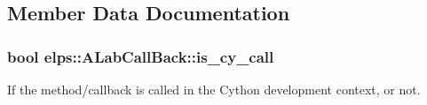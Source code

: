 \subsection{Member Data Documentation}
\hypertarget{classelps_1_1_a_lab_call_back_a15debd77d822894cfcd63465b0c35c21}{
\subsubsection[{is\+\_\+cy\+\_\+call}]{\setlength{\rightskip}{0pt plus 5cm}bool elps\+::\+A\+Lab\+Call\+Back\+::is\+\_\+cy\+\_\+call\hspace{0.3cm}{\ttfamily [protected]}}}\label{classelps_1_1_a_lab_call_back_a15debd77d822894cfcd63465b0c35c21}
If the method/callback is called in the Cython development context, or not. 